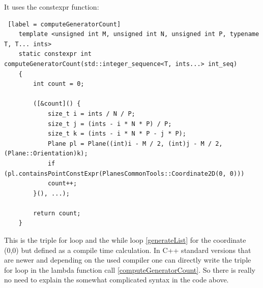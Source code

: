 It uses the constexpr function:

\begin{lstlisting} [label = computeGeneratorCount]
	template <unsigned int M, unsigned int N, unsigned int P, typename T, T... ints>
	static constexpr int computeGeneratorCount(std::integer_sequence<T, ints...> int_seq)
	{
		int count = 0;
		
		([&count]() {
			size_t i = ints / N / P;
			size_t j = (ints - i * N * P) / P;
			size_t k = (ints - i * N * P - j * P);
			Plane pl = Plane((int)i - M / 2, (int)j - M / 2, (Plane::Orientation)k);
			if (pl.containsPointConstExpr(PlanesCommonTools::Coordinate2D(0, 0)))
			count++;
		}(), ...);
		
		return count;
	}
\end{lstlisting}

This is the triple for loop and the while loop \ref{generateList} for the coordinate (0,0) but defined as a compile time calculation. In C++ standard versions that are newer and depending on the used compiler one can directly write the triple for loop in the lambda function call \ref{computeGeneratorCount}. So there is really no need to explain the somewhat complicated syntax in the code above.